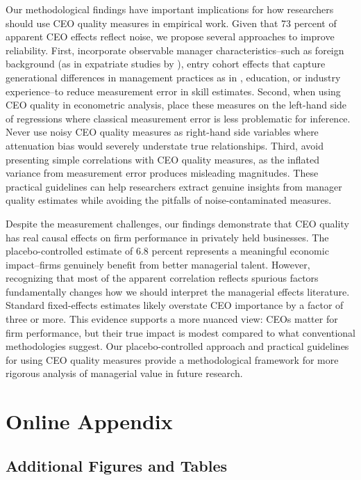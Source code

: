 \documentclass[11pt,a4paper]{article}
\begin{document}
Our methodological findings have important implications for how researchers should use CEO quality measures in empirical work. Given that 73 percent of apparent CEO effects reflect noise, we propose several approaches to improve reliability. First, incorporate observable manager characteristics\---such as foreign background (as in expatriate studies by \citet{Koren2023expat}), entry cohort effects that capture generational differences in management practices as in \citet{koren2024managers}, education, or industry experience\---to reduce measurement error in skill estimates. Second, when using CEO quality in econometric analysis, place these measures on the left-hand side of regressions where classical measurement error is less problematic for inference. Never use noisy CEO quality measures as right-hand side variables where attenuation bias would severely understate true relationships. Third, avoid presenting simple correlations with CEO quality measures, as the inflated variance from measurement error produces misleading magnitudes. These practical guidelines can help researchers extract genuine insights from manager quality estimates while avoiding the pitfalls of noise-contaminated measures.

Despite the measurement challenges, our findings demonstrate that CEO quality has real causal effects on firm performance in privately held businesses. The placebo-controlled estimate of 6.8 percent represents a meaningful economic impact\---firms genuinely benefit from better managerial talent. However, recognizing that most of the apparent correlation reflects spurious factors fundamentally changes how we should interpret the managerial effects literature. Standard fixed-effects estimates likely overstate CEO importance by a factor of three or more. This evidence supports a more nuanced view: CEOs matter for firm performance, but their true impact is modest compared to what conventional methodologies suggest. Our placebo-controlled approach and practical guidelines for using CEO quality measures provide a methodological framework for more rigorous analysis of managerial value in future research.





\appendix
\section{Online Appendix}

\subsection{Additional Figures and Tables}
\end{document}
